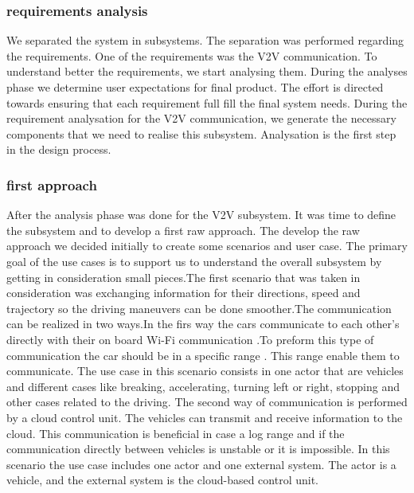 \documentclass[conference]{IEEEtran}
\begin{document}
\subsubsection{requirements analysis }
We separated the system in subsystems. The separation was performed regarding the requirements. One of the requirements was the V2V communication. To understand better the requirements, we start analysing them. During the analyses phase we determine user expectations for final product. The effort is directed towards ensuring that each requirement full fill the final system needs. During the requirement analysation for the V2V communication, we generate the necessary components that we need to realise this subsystem. Analysation is the first step in the design process.

\vspace{3mm}
\subsubsection{first approach }
After the analysis phase was done for the V2V subsystem. It was time to define the subsystem and to develop a first raw approach. The develop the raw approach we decided initially to create some scenarios and user case. The primary goal of the use cases is to support us to understand the overall subsystem by getting in consideration small pieces.The first scenario that was taken in consideration was exchanging information for their directions, speed and trajectory so the driving maneuvers can be done smoother.The communication can be realized in two ways.In the firs way the cars communicate to each other’s directly with their on board Wi-Fi communication .To preform this type of communication the car should be in a specific range . This range enable them to communicate. The use case in this scenario consists in one actor that are vehicles and different cases like breaking, accelerating, turning left or right, stopping and other cases related to the driving. The second way of communication is performed by a cloud control unit. The vehicles can transmit and receive information to the cloud. This communication is beneficial in case a log range and if the communication directly between vehicles is unstable or it is impossible. In this scenario the use case includes one actor and one external system. The actor is a vehicle, and the external system is the cloud-based control unit.
\vspace{3mm}
\end{document}
